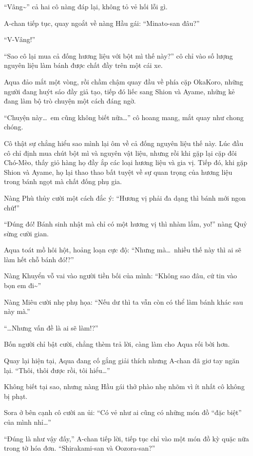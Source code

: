 \documentclass[../main.tex]{subfiles}
\begin{document}
``Vâng\~{}'' cả hai cô nàng đáp lại, không tỏ vẻ hối lỗi gì.

A-chan tiếp tục, quay ngoắt về nàng Hầu gái: ``Minato-san đâu?''

``V-Vâng!''

``Sao cô lại mua cả đống hương liệu với bột mì thế này?'' cô chỉ vào số lượng nguyên liệu làm bánh được chất đầy trên một cái xe.

Aqua đảo mắt một vòng, rồi chầm chậm quay đầu về phía cặp OkaKoro, những người đang huýt sáo đầy giả tạo, tiếp đó liếc sang Shion và Ayame, những kẻ đang làm bộ trò chuyện một cách đáng ngờ.

``Chuyện này\dots\ em cũng không biết nữa\dots'' cô hoang mang, mắt quay như chong chóng.

Cô thật sự chẳng hiểu sao mình lại ôm về cả đống nguyên liệu thế này. Lúc đầu cô chỉ định mua chút bột mì và nguyên vật liệu, nhưng rồi khi gặp lại cặp đôi Chó-Mèo, thấy giỏ hàng họ đầy ắp các loại hương liệu và gia vị. Tiếp đó, khi gặp Shion và Ayame, họ lại thao thao bất tuyệt về sự quan trọng của hương liệu trong bánh ngọt mà chất đống phụ gia.

Nàng Phù thủy cười một cách đắc ý: ``Hương vị phải đa dạng thì bánh mới ngon chứ!''

``Đúng đó! Bánh sinh nhật mà chỉ có một hương vị thì nhàm lắm, yo!'' nàng Quỷ sừng cười gian.

Aqua toát mồ hôi hột, hoảng loạn cực độ: ``Nhưng mà\dots\ nhiều thế này thì ai sẽ làm hết chỗ bánh đó!?''

Nàng Khuyển vỗ vai vào người tiền bối của mình: ``Không sao đâu, cứ tin vào bọn em đi\~{}''

Nàng Miêu cười nhẹ phụ họa: ``Nếu dư thì ta vẫn còn có thể làm bánh khác sau này mà.''

``\dots Nhưng vấn đề là ai sẽ làm!?''

Bốn người chỉ bật cười, chẳng thèm trả lời, càng làm cho Aqua rối bời hơn.

Quay lại hiện tại, Aqua đang cố gắng giải thích nhưng A-chan đã giơ tay ngăn lại. ``Thôi, thôi được rồi, tôi hiểu\dots''

Không biết tại sao, nhưng nàng Hầu gái thở phào nhẹ nhõm vì ít nhất cô không bị phạt.

Sora ở bên cạnh cô cười an ủi: ``Có vẻ như ai cũng có những món đồ ``đặc biệt'' của mình nhỉ\dots''

``Đúng là như vậy đấy,'' A-chan tiếp lời, tiếp tục chỉ vào một món đồ kỳ quặc nữa trong tờ hóa đơn. ``Shirakami-san và Oozora-san?''
\end{document}
